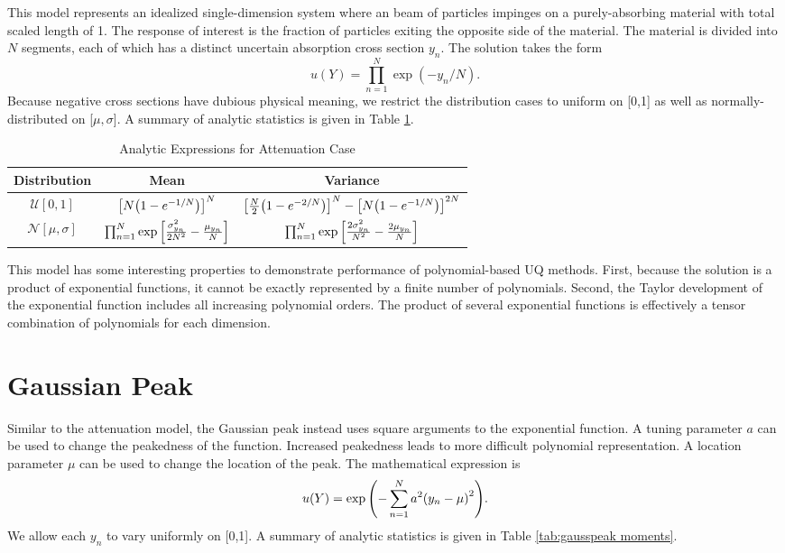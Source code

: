 This model represents an idealized single-dimension system where an beam of particles impinges on a
purely-absorbing material with total scaled length of 1.  The response of interest is the fraction of
particles exiting the opposite side of the material.  The material is divided into $N$ segments, each of which
has a distinct uncertain absorption cross section $y_n$.  The solution takes the form
\begin{equation}
  u(Y) = \prod_{n=1}^N \exp(-y_n/N).
\end{equation}
Because negative cross sections have dubious physical meaning, we restrict the distribution cases to uniform
on [0,1] as well as normally-distributed on [$\mu,\sigma$].  A summary of analytic statistics is given in
Table \ref{tab:attenuation moments}.

\begin{table}[H]
  \centering
  \begin{tabular}{c|c|c}
    Distribution & Mean & Variance \\\hline
    $\mathcal{U}[0,1]$ & $\qty[N\qty(1-e^{-1/N})]^N$ & $\qty[\frac{N}{2}\qty(1-e^{-2/N})]^N -
                       \qty[N\qty(1-e^{-1/N})]^{2N}$ \\
    $\mathcal{N}[\mu,\sigma]$ & $\prod_{n=1}^N \exp\qty[\frac{\sigma_{y_n}^2}{2N^2}-\frac{\mu_{y_n}}{N}]$
    & $\prod_{n=1}^N \exp\qty[\frac{2\sigma_{y_n}^2}{N^2} - \frac{2\mu_{y_n}}{N}]$
  \end{tabular}
  \caption{Analytic Expressions for Attenuation Case}
  \label{tab:attenuation moments}
\end{table}

This model has some interesting properties to demonstrate performance of polynomial-based UQ methods.  First,
because the solution is a product of exponential functions, it cannot be exactly represented by a finite
number of polynomials.  Second, the Taylor development of the exponential function includes all increasing
polynomial orders.  The product of several exponential functions is effectively a tensor combination of
polynomials for each dimension.

\section{Gaussian Peak}\label{mod:gausspeak}
Similar to the attenuation model, the Gaussian peak \cite{sfugenz} instead uses square arguments to the
exponential function.  A tuning parameter $a$ can be used to change the peakedness of the
function.  Increased peakedness leads to more difficult polynomial representation.  
A location parameter $\mu$ can be used to change the location of the peak.
The mathematical expression is
\begin{equation}
  u(Y) = \exp\qty(-\sum_{n=1}^N a^2\qty(y_n-\mu)^2).
\end{equation}
We allow each $y_n$ to vary uniformly on [0,1].
A summary of analytic statistics is given in Table \ref{tab:gausspeak moments}.

